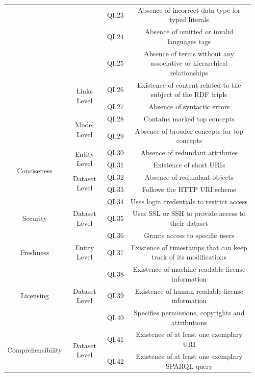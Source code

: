 \documentclass[onecolumn, crcready]{iosart2c}
\begin{document}
\begin{landscape}
\begin{center}
{\begin{longtable}[h]{|c|c|c|c|}
\cline{3-4}
 &  & QI.23 & Absence of incorrect data type for typed literals \cite{Hogan2010}\cite{Acosta2013} \tabularnewline
\cline{3-4}
 &  & QI.24 & Absence of omitted or invalid languages tags \cite{Suominen:2012:IQS:2413941.2413985}\cite{Mader2012}\tabularnewline
\cline{3-4}
 &  & QI.25 & Absence of terms without any associative or hierarchical relationships \cite{journals/ires/Living10}\tabularnewline
\cline{2-4}
 & \multirow{2}{*}{Links Level} & QI.26 & Existence of content related to the subject of the RDF triple \cite{Suominen:2012:IQS:2413941.2413985}\cite{Acosta2013}\tabularnewline
\cline{3-4}
 &  & QI.27 & Absence of syntactic errors  \cite{Suominen2013}\tabularnewline
\cline{2-4}
 & \multirow{2}{*}{Model Level} & QI.28 & Contains marked top concepts \cite{Mader2012}\tabularnewline
\cline{3-4}
 &  & QI.29 & Absence of broader concepts for top concepts \cite{Mader2012}\tabularnewline
\hline
\hline
\multirow{4}{*}{Conciseness} & \multirow{2}{*}{Entity Level} & QI.30 & Absence of redundant attributes \cite{Mendes2012}\tabularnewline
\cline{3-4}
 &  & QI.31 & Existence of short URIs \cite{Framework2012}\tabularnewline
\cline{2-4}
 & \multirow{2}{*}{Dataset Level} & QI.32 & Absence of redundant objects \cite{Mendes2012}\tabularnewline
\cline{3-4}
 &  & QI.33 & Follows the HTTP URI scheme \cite{Hogan:2012:ESL:2263498.2264570}\cite{Suominen2013}\tabularnewline
\hline
\hline
\multirow{3}{*}{Security} & \multirow{3}{*}{Dataset Level} & QI.34 & Uses login credentials to restrict access \cite{Framework2012}\tabularnewline
\cline{3-4}
 &  & QI.35 & Uses SSL or SSH to provide access to their dataset \cite{Framework2012}\tabularnewline
\cline{3-4}
 &  & QI.36 & Grants access to specific users \cite{Framework2012}\tabularnewline
\hline
\hline
\multirow{1}{*}{Freshness} & \multirow{1}{*}{Entity Level} & QI.37 & Existence of timestamps that can keep track of its modifications  \cite{Flouris2012}\tabularnewline
\hline
\hline
\multirow{3}{*}{Licensing} & \multirow{3}{*}{Dataset Level} & QI.38 & Existence of machine readable license information \cite{Hogan:2012:ESL:2263498.2264570}\tabularnewline
\cline{3-4}
 &  & QI.39 & Existence of human readable license information  \cite{Hogan:2012:ESL:2263498.2264570}\tabularnewline
\cline{3-4}
 &  & QI.40 & Specifies permissions, copyrights and attributions  \cite{Framework2012}\tabularnewline
\hline
\hline
\multirow{5}{*}{Comprehensibility} & \multirow{5}{*}{Dataset Level} & QI.41 & Existence of at least one exemplary URI \cite{Framework2012}\tabularnewline
\cline{3-4}
 &  & QI.42 & Existence of at least one exemplary SPARQL query \cite{Framework2012}\tabularnewline

\end{longtable}}
\end{center}
\end{landscape}
\end{document}
